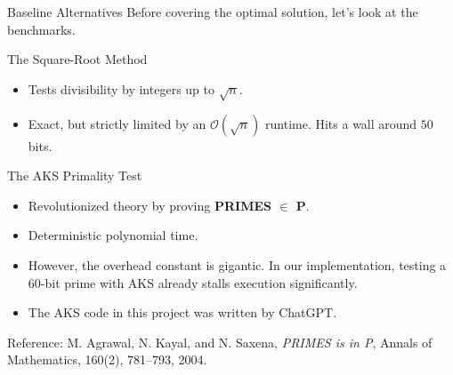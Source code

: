 \documentclass[10pt, compress]{beamer}
\begin{document}
\begin{frame}{Baseline Alternatives}
    Before covering the optimal solution, let's look at the benchmarks.
    
    \pause
    \begin{block}{The Square-Root Method}
        \begin{itemize}
            \item Tests divisibility by integers up to $\sqrt{n}$.
            \item Exact, but strictly limited by an $\mathcal{O}(\sqrt{n})$ runtime. Hits a wall around $50$ bits.
        \end{itemize}
    \end{block}
    
    \pause
    \begin{block}{The AKS Primality Test}
        \begin{itemize}
            \item Revolutionized theory by proving \textbf{PRIMES $\in$ P}.
            \item Deterministic polynomial time. 
            \item However, the overhead constant is gigantic. In our implementation, testing a 60-bit prime with AKS already stalls execution significantly.
            \item The AKS code in this project was written by ChatGPT.
        \end{itemize}
    \end{block}

    \vspace{0.2cm}
    {\tiny Reference: M. Agrawal, N. Kayal, and N. Saxena, \textit{PRIMES is in P}, Annals of Mathematics, 160(2), 781--793, 2004.}
\end{frame}
\end{document}
